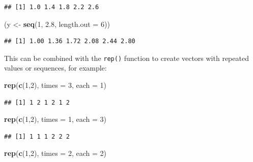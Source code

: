 \documentclass[12pt,]{krantz}
\newenvironment{Shaded}{\begin{snugshade}}{\end{snugshade}}
\newcommand{\KeywordTok}[1]{\textcolor[rgb]{0.27,0.27,0.27}{\textbf{#1}}}
\newcommand{\DataTypeTok}[1]{\textcolor[rgb]{0.27,0.27,0.27}{#1}}
\newcommand{\DecValTok}[1]{\textcolor[rgb]{0.06,0.06,0.06}{#1}}
\newcommand{\FloatTok}[1]{\textcolor[rgb]{0.06,0.06,0.06}{#1}}
\newcommand{\StringTok}[1]{\textcolor[rgb]{0.5,0.5,0.5}{#1}}
\newcommand{\NormalTok}[1]{#1}
\begin{document}
\begin{verbatim}
## [1] 1.0 1.4 1.8 2.2 2.6
\end{verbatim}

\begin{Shaded}
\begin{Highlighting}[]
\NormalTok{(y <-}\StringTok{ }\KeywordTok{seq}\NormalTok{(}\DecValTok{1}\NormalTok{, }\FloatTok{2.8}\NormalTok{, }\DataTypeTok{length.out =} \DecValTok{6}\NormalTok{))}
\end{Highlighting}
\end{Shaded}

\begin{verbatim}
## [1] 1.00 1.36 1.72 2.08 2.44 2.80
\end{verbatim}

This can be combined with the \texttt{rep()} function to create vectors
with repeated values or sequences, for example:

\begin{Shaded}
\begin{Highlighting}[]
\KeywordTok{rep}\NormalTok{(}\KeywordTok{c}\NormalTok{(}\DecValTok{1}\NormalTok{,}\DecValTok{2}\NormalTok{), }\DataTypeTok{times =} \DecValTok{3}\NormalTok{, }\DataTypeTok{each =} \DecValTok{1}\NormalTok{)}
\end{Highlighting}
\end{Shaded}

\begin{verbatim}
## [1] 1 2 1 2 1 2
\end{verbatim}

\begin{Shaded}
\begin{Highlighting}[]
\KeywordTok{rep}\NormalTok{(}\KeywordTok{c}\NormalTok{(}\DecValTok{1}\NormalTok{,}\DecValTok{2}\NormalTok{), }\DataTypeTok{times =} \DecValTok{1}\NormalTok{, }\DataTypeTok{each =} \DecValTok{3}\NormalTok{)}
\end{Highlighting}
\end{Shaded}

\begin{verbatim}
## [1] 1 1 1 2 2 2
\end{verbatim}

\begin{Shaded}
\begin{Highlighting}[]
\KeywordTok{rep}\NormalTok{(}\KeywordTok{c}\NormalTok{(}\DecValTok{1}\NormalTok{,}\DecValTok{2}\NormalTok{), }\DataTypeTok{times =} \DecValTok{2}\NormalTok{, }\DataTypeTok{each =} \DecValTok{2}\NormalTok{)}
\end{Highlighting}
\end{Shaded}
\end{document}
